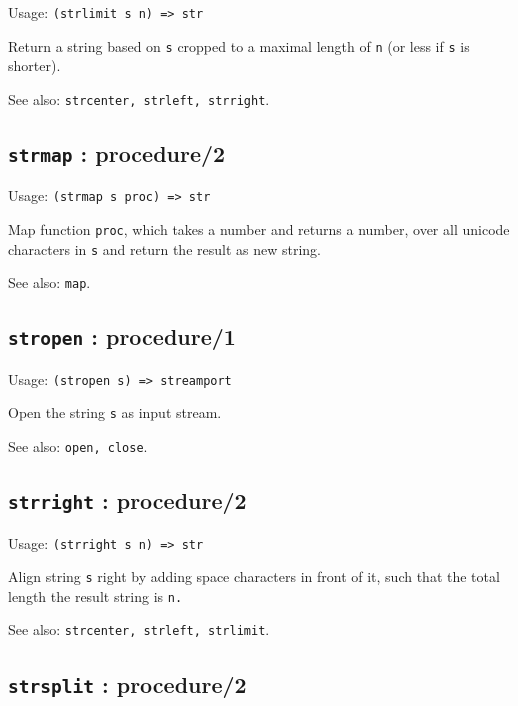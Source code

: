\documentclass[
]{article}
\newcommand{\passthrough}[1]{#1}
\begin{document}
Usage: \passthrough{\lstinline!(strlimit s n) => str!}

Return a string based on \passthrough{\lstinline!s!} cropped to a
maximal length of \passthrough{\lstinline!n!} (or less if
\passthrough{\lstinline!s!} is shorter).

See also: \passthrough{\lstinline!strcenter, strleft, strright!}.

\hypertarget{strmap-procedure2-1}{%
\subsection{\texorpdfstring{\texttt{strmap} :
procedure/2}{strmap : procedure/2}}\label{strmap-procedure2-1}}

Usage: \passthrough{\lstinline!(strmap s proc) => str!}

Map function \passthrough{\lstinline!proc!}, which takes a number and
returns a number, over all unicode characters in
\passthrough{\lstinline!s!} and return the result as new string.

See also: \passthrough{\lstinline!map!}.

\hypertarget{stropen-procedure1-1}{%
\subsection{\texorpdfstring{\texttt{stropen} :
procedure/1}{stropen : procedure/1}}\label{stropen-procedure1-1}}

Usage: \passthrough{\lstinline!(stropen s) => streamport!}

Open the string \passthrough{\lstinline!s!} as input stream.

See also: \passthrough{\lstinline!open, close!}.

\hypertarget{strright-procedure2-1}{%
\subsection{\texorpdfstring{\texttt{strright} :
procedure/2}{strright : procedure/2}}\label{strright-procedure2-1}}

Usage: \passthrough{\lstinline!(strright s n) => str!}

Align string \passthrough{\lstinline!s!} right by adding space
characters in front of it, such that the total length the result string
is \passthrough{\lstinline!n.!}

See also: \passthrough{\lstinline!strcenter, strleft, strlimit!}.

\hypertarget{strsplit-procedure2-1}{%
\subsection{\texorpdfstring{\texttt{strsplit} :
procedure/2}{strsplit : procedure/2}}\label{strsplit-procedure2-1}}
\end{document}
